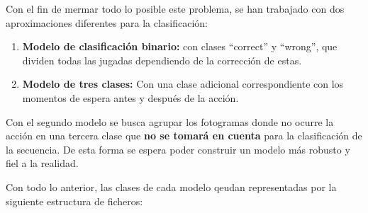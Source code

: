 \documentclass[12pt]{report} %
\begin{document}
    Con el fin de mermar todo lo posible este problema, se han trabajado con
    dos aproximaciones diferentes para la clasificación: 

%    

    \begin{enumerate}
        \item \textbf{Modelo de clasificación binario:} con clases ``correct'' y ``wrong'', que dividen todas las jugadas dependiendo de la corrección de estas.
        \item \textbf{Modelo de tres clases:} Con una clase adicional correspondiente con los momentos de espera antes y después de la acción.
    \end{enumerate}

    Con el segundo modelo se busca agrupar los fotogramas donde no ocurre la
    acción en una tercera clase que \textbf{no se tomará en cuenta} para la
    clasificación de la secuencia. De esta forma se espera poder construir un
    modelo más robusto y fiel a la realidad.

    Con todo lo anterior, las clases de cada modelo qeudan representadas por la siguiente estructura de ficheros:
\end{document}
